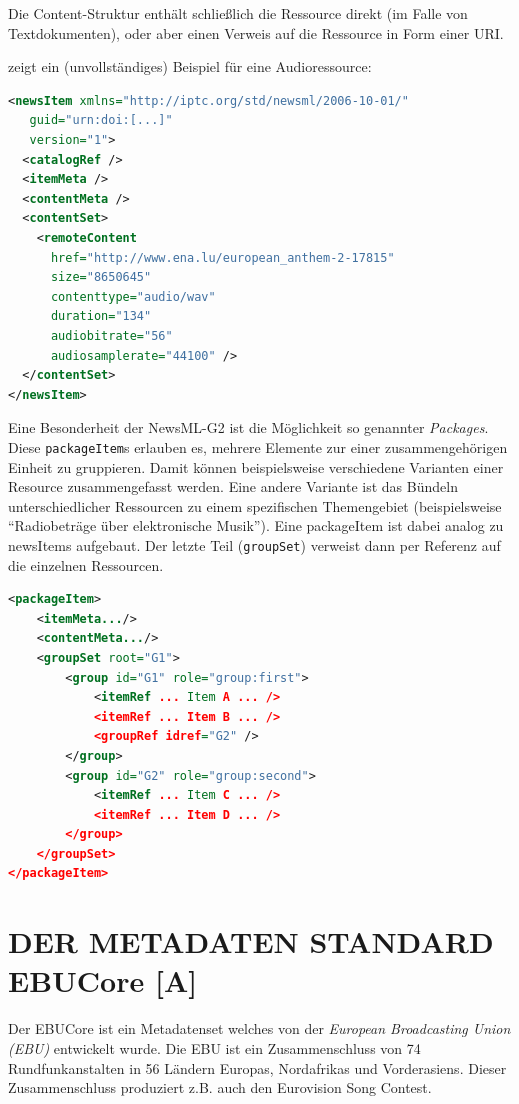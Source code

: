 	Die Content-Struktur enthält schließlich die Ressource direkt (im Falle von Textdokumenten), oder aber einen Verweis auf die Ressource in Form einer URI.
	
	 zeigt ein (unvollständiges) Beispiel für eine Audioressource:
		\begin{lstlisting}[language=XML, caption=Beispiel-XML IPTC NewsML-G2 für die Europäische Hymne, label=lis:newsml-item]
<newsItem xmlns="http://iptc.org/std/newsml/2006-10-01/"
   guid="urn:doi:[...]"
   version="1">
  <catalogRef />
  <itemMeta />
  <contentMeta />
  <contentSet>
    <remoteContent
      href="http://www.ena.lu/european_anthem-2-17815"
      size="8650645"
      contenttype="audio/wav"
      duration="134"
      audiobitrate="56"
      audiosamplerate="44100" />
  </contentSet>
</newsItem>
	\end{lstlisting}

	Eine Besonderheit der NewsML-G2 ist die Möglichkeit so genannter \emph{Packages}. Diese \texttt{packageItem}s erlauben es, mehrere Elemente zur einer zusammengehörigen Einheit zu gruppieren. Damit können beispielsweise verschiedene Varianten einer Resource zusammengefasst werden. Eine andere Variante ist das Bündeln unterschiedlicher Ressourcen zu einem spezifischen Themengebiet (beispielsweise \enquote{Radiobeträge über elektronische Musik}). Eine packageItem ist dabei analog zu newsItems aufgebaut. Der letzte Teil (\texttt{groupSet}) verweist dann per Referenz auf die einzelnen Ressourcen.
	
	\begin{lstlisting}[language=XML, caption=Beispiel-XML IPTC NewsML-G2 für ein Package, label=lis:newsml-package]
<packageItem>
	<itemMeta.../>
	<contentMeta.../>
	<groupSet root="G1">
		<group id="G1" role="group:first">
			<itemRef ... Item A ... />
			<itemRef ... Item B ... />
			<groupRef idref="G2" />
		</group>
		<group id="G2" role="group:second">
			<itemRef ... Item C ... />
			<itemRef ... Item D ... />
		</group>
	</groupSet>
</packageItem>
	\end{lstlisting}

	\newpage
	\section{DER METADATEN STANDARD EBUCore \hfill [A]}
	Der EBUCore ist ein Metadatenset welches von der \emph{European Broadcasting Union (EBU)} entwickelt wurde. Die EBU ist ein Zusammenschluss von 74 Rundfunkanstalten  in 56 Ländern Europas, Nordafrikas und Vorderasiens. Dieser Zusammenschluss produziert z.B. auch den Eurovision Song Contest.
	
